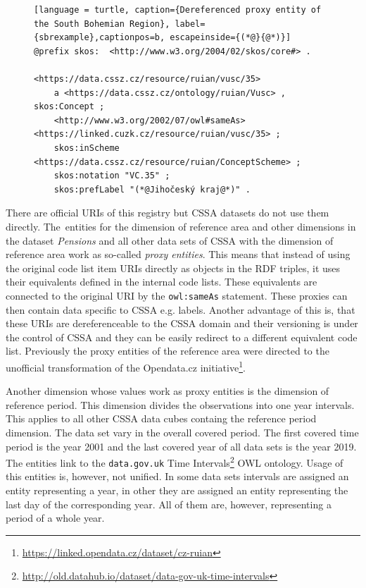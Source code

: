 \begin{figure}[h]
\begin{lstlisting}[language = turtle, caption={Dereferenced proxy entity of the South Bohemian Region}, label={sbrexample},captionpos=b, escapeinside={(*@}{@*)}]
@prefix skos:  <http://www.w3.org/2004/02/skos/core#> .

<https://data.cssz.cz/resource/ruian/vusc/35>
    a <https://data.cssz.cz/ontology/ruian/Vusc> , skos:Concept ;
    <http://www.w3.org/2002/07/owl#sameAs> <https://linked.cuzk.cz/resource/ruian/vusc/35> ;
    skos:inScheme  <https://data.cssz.cz/resource/ruian/ConceptScheme> ;
    skos:notation "VC.35" ;
    skos:prefLabel "(*@Jihočeský kraj@*)" .
\end{lstlisting}
\end{figure}

There are official URIs of this registry but CSSA datasets do not use them directly. The~entities for the dimension of reference area and other dimensions in the dataset \textit{Pensions} and all other data sets of CSSA with the dimension of reference area work as so-called \textit{proxy entities}. This means that instead of using the original code list item URIs directly as objects in the RDF triples,  it uses their equivalents defined in the internal code lists. These equivalents are connected to the original URI by the \verb|owl:sameAs| statement. These proxies can then contain data specific to CSSA e.g. labels. Another advantage of this is, that these URIs are dereferenceable to the CSSA domain and their versioning is under the control of CSSA and they can be easily redirect to a different equivalent code list. Previously the proxy entities of the reference area were directed to the unofficial transformation of the Opendata.cz initiative\footnote{\href{https://linked.opendata.cz/dataset/cz-ruian}{https://linked.opendata.cz/dataset/cz-ruian}}.

Another dimension whose values work as proxy entities is the dimension of reference period. This dimension divides the observations into one year intervals. This applies to all other CSSA data cubes containg the reference period dimension. The data set vary in the overall covered period. The first covered time period is the year 2001 and the last covered year of all data sets is the year 2019. The entities link to the \verb|data.gov.uk| Time Intervals\footnote{\href{http://old.datahub.io/dataset/data-gov-uk-time-intervals}{http://old.datahub.io/dataset/data-gov-uk-time-intervals}} OWL ontology. Usage of this entities is, however, not unified. In some data sets intervals are assigned an entity representing a year, in other they are assigned an entity representing the last day of the corresponding year. All of them are, however, representing a period of a whole year.

